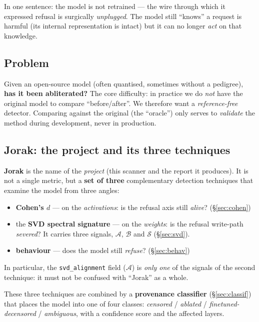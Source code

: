 \documentclass[11pt,a4paper]{article}
\theoremstyle{definition}
\theoremstyle{plain}
\begin{document}
In one sentence: the model is not retrained — the wire through which it expressed
refusal is surgically \emph{unplugged}. The model still ``knows'' a request is
harmful (its internal representation is intact) but it can no longer \emph{act} on
that knowledge.

\subsection{Problem}
Given an open-source model (often quantised, sometimes without a pedigree),
\textbf{has it been abliterated?} The core difficulty: in practice we do \emph{not}
have the original model to compare ``before/after''. We therefore want a
\emph{reference-free} detector. Comparing against the original (the ``oracle'') only
serves to \emph{validate} the method during development, never in production.

\subsection{Jorak: the project and its three techniques}
\begin{intuition}[Jorak = the project, not one metric]
\textbf{Jorak} is the name of the \emph{project} (this scanner and the report it
produces). It is not a single metric, but a \textbf{set of three} complementary
detection techniques that examine the model from three angles:
\begin{itemize}\itemsep1pt
  \item \textbf{Cohen's $d$} — on the \emph{activations}: is the refusal axis still
  \emph{alive}? (\S\ref{sec:cohen})
  \item the \textbf{SVD spectral signature} — on the \emph{weights}: is the refusal
  write-path \emph{severed}? It carries three signals, $\mathcal{A}$, $\mathcal{B}$
  and $\mathcal{S}$ (\S\ref{sec:svd}).
  \item \textbf{behaviour} — does the model still \emph{refuse}? (\S\ref{sec:behav})
\end{itemize}
In particular, the \texttt{svd\_alignment} field ($\mathcal{A}$) is \emph{only one}
of the signals of the second technique: it must not be confused with ``Jorak'' as a
whole.
\end{intuition}

\noindent These three techniques are combined by a \textbf{provenance classifier}
(\S\ref{sec:classif}) that places the model into one of four classes:
\emph{censored} / \emph{ablated} / \emph{finetuned-decensored} / \emph{ambiguous},
with a confidence score and the affected layers.
\end{document}
